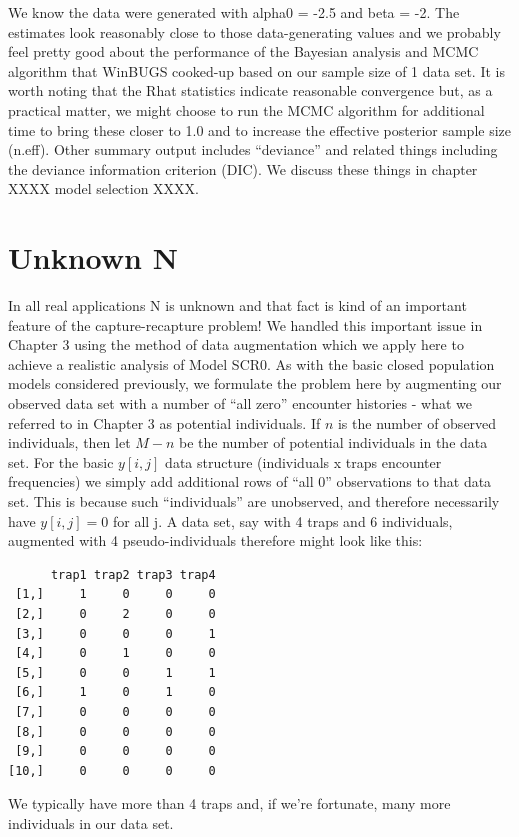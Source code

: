 We know the data were generated with alpha0 = -2.5 and beta = -2. The estimates look reasonably close to those data-generating values and we probably feel pretty good about the performance of the Bayesian analysis and MCMC algorithm that WinBUGS cooked-up based on our sample size of 1 data set.  It is worth noting that the Rhat statistics indicate reasonable convergence but, as a practical matter, we might choose to run the MCMC algorithm for additional time to bring these closer to 1.0 and to increase the effective posterior sample size (n.eff). Other summary output includes ``deviance'' and related things including the deviance information criterion (DIC). We discuss these things in chapter XXXX model selection XXXX. 


\section{Unknown N}
\label{scr0.sec.unknownN}

In all real applications N is unknown and that fact is kind of an important feature of the capture-recapture problem!  We handled this important issue in Chapter 3 using the method of data augmentation which we apply here to achieve a realistic analysis of Model SCR0. As with the basic closed population models considered previously, we formulate the problem here by augmenting our observed data set with a number of ``all zero'' encounter histories - what we referred to in Chapter 3 as potential individuals. If $n$ is the number of observed individuals, then let $M-n$ be the number of potential individuals in the data set. For the basic $y[i,j]$ data structure (individuals x traps encounter frequencies) we simply add additional rows of ``all 0'' observations to that data set. This is because such ``individuals'' are unobserved, and therefore necessarily have $y[i,j]=0$ for all j.  A data set, say with 4 traps and 6 individuals, augmented with 4 pseudo-individuals therefore might look like this:

\begin{verbatim}
      trap1 trap2 trap3 trap4 
 [1,]     1     0     0     0
 [2,]     0     2     0     0
 [3,]     0     0     0     1
 [4,]     0     1     0     0
 [5,]     0     0     1     1
 [6,]     1     0     1     0
 [7,]     0     0     0     0
 [8,]     0     0     0     0
 [9,]     0     0     0     0
[10,]     0     0     0     0
\end{verbatim}

We typically have more than 4 traps and, if we're fortunate, many more individuals in our data set. 

